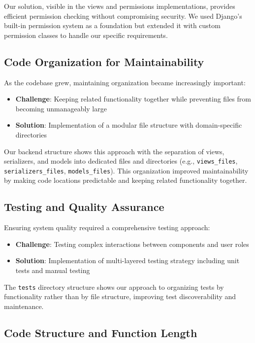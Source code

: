 Our solution, visible in the views and permissions implementations, provides efficient permission checking without compromising security. We used Django's built-in permission system as a foundation but extended it with custom permission classes to handle our specific requirements.

\subsection{Code Organization for Maintainability}

As the codebase grew, maintaining organization became increasingly important:

\begin{itemize}
    \item \textbf{Challenge}: Keeping related functionality together while preventing files from becoming unmanageably large
    \item \textbf{Solution}: Implementation of a modular file structure with domain-specific directories
\end{itemize}

Our backend structure shows this approach with the separation of views, serializers, and models into dedicated files and directories (e.g., \texttt{views\_files}, \texttt{serializers\_files}, \texttt{models\_files}). This organization improved maintainability by making code locations predictable and keeping related functionality together.

\subsection{Testing and Quality Assurance}

Ensuring system quality required a comprehensive testing approach:

\begin{itemize}
    \item \textbf{Challenge}: Testing complex interactions between components and user roles
    \item \textbf{Solution}: Implementation of multi-layered testing strategy including unit tests and manual testing
\end{itemize}

The \texttt{tests} directory structure shows our approach to organizing tests by functionality rather than by file structure, improving test discoverability and maintenance.

\subsection{Code Structure and Function Length}

